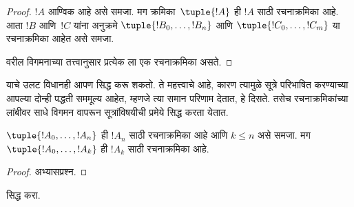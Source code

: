 \documentclass[../../../include/open-logic-section]{subfiles}
\begin{document}
\begin{proof}
$!A$ आण्विक आहे असे समजा. मग क्रमिका~$\tuple{!A}$ ही $!A$ साठी
रचनाक्रमिका आहे.
%
आता $!B$ आणि~$!C$ यांना अनुक्रमे $\tuple{!B_0,\dotsc,!B_n}$ आणि
$\tuple{!C_0,\dotsc,!C_m}$ या रचनाक्रमिका आहेत असे समजा.
%
\begin{enumerate}
\end{enumerate}
वरील विगमनाच्या तत्त्वानुसार प्रत्येक ला एक
रचनाक्रमिका असते.
\end{proof}

याचे उलट विधानही आपण सिद्ध करू शकतो. ते महत्त्वाचे आहे, कारण त्यामुळे
सूत्रे परिभाषित करण्याच्या आपल्या दोन्ही पद्धती सममूल्य आहेत, म्हणजे
त्या समान परिणाम देतात, हे दिसते. तसेच रचनाक्रमिकांच्या लांबीवर साधे
विगमन वापरून सूत्रांविषयीची प्रमेये सिद्ध करता येतात.

\begin{lem}
$\tuple{!A_0,\dotsc,!A_n}$ ही $!A_n$ साठी रचनाक्रमिका आहे आणि
$k \leq n$ असे समजा. मग $\tuple{!A_0,\dotsc,!A_k}$ ही $!A_k$ साठी
रचनाक्रमिका आहे.
\end{lem}

\begin{proof}
अभ्यासप्रश्न.
\end{proof}

\begin{prob}
 सिद्ध करा.
\end{prob}
\end{document}
